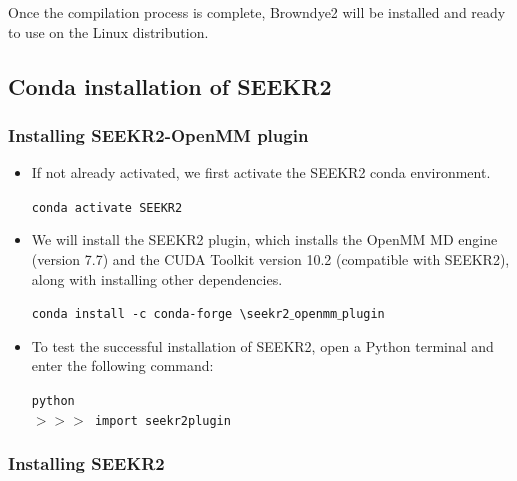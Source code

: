 \documentclass[9pt,training,pubversion]{livecoms}
\begin{document}
\noindent Once the compilation process is complete, Browndye2 will be installed and ready to use on the Linux distribution.


\subsection{Conda installation of SEEKR2}
\vspace{2mm}

\subsubsection{Installing SEEKR2-OpenMM plugin}
\vspace{2mm}

\begin{itemize}

\item If not already activated, we first activate the SEEKR2 conda environment. 

\begin{tcolorbox}[colback=black!8!white, colframe=black!50!black, fontlower=\tiny, left=2pt, right=2pt, top=2pt, bottom=2pt] 
\texttt{conda activate SEEKR2}
\end{tcolorbox}

\item We will install the SEEKR2 plugin, which installs the OpenMM MD engine (version 7.7) and the CUDA Toolkit version 10.2 (compatible with SEEKR2), along with installing other dependencies.

\begin{tcolorbox}[colback=black!8!white, colframe=black!50!black, fontlower=\tiny, left=2pt, right=2pt, top=2pt, bottom=2pt] 
\texttt{conda install -c conda-forge \textbackslash \linebreak seekr2$\_$openmm$\_$plugin}
\end{tcolorbox}

\item To test the successful installation of SEEKR2, open a Python terminal and enter the following command: 
\begin{tcolorbox}[colback=black!8!white, colframe=black!50!black, fontlower=\tiny, left=2pt, right=2pt, top=2pt, bottom=2pt] 
\texttt{python} \\
\texttt{$>$$>$$>$ import seekr2plugin}
\end{tcolorbox}

\end{itemize}

\subsubsection{Installing SEEKR2} \label{seekrinstall}
\vspace{2mm}
\end{document}

